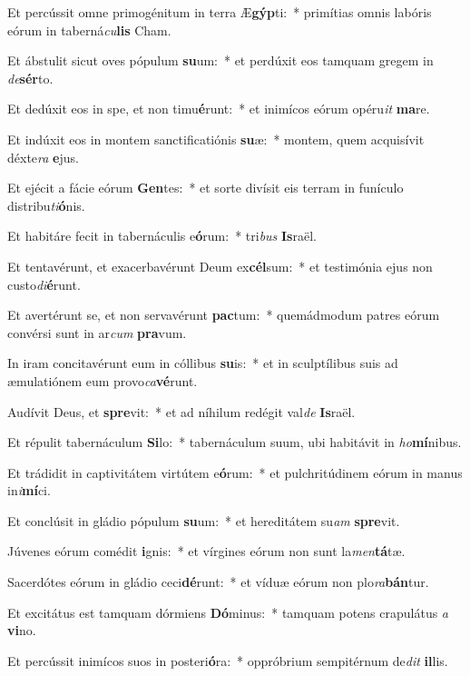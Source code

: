 \item Et percússit omne primogénitum in terra Æ\textbf{gýp}ti:~* primítias omnis labóris eórum in taberná\textit{cu}\textbf{lis} Cham.
\item Et ábstulit sicut oves pópulum \textbf{su}um:~* et perdúxit eos tamquam gregem in \textit{de}\textbf{sér}to.
\item Et dedúxit eos in spe, et non timu\textbf{é}runt:~* et inimícos eórum opéru\textit{it} \textbf{ma}re.
\item Et indúxit eos in montem sanctificatiónis \textbf{su}æ:~* montem, quem acquisívit déxte\textit{ra} \textbf{e}jus.
\item Et ejécit a fácie eórum \textbf{Gen}tes:~* et sorte divísit eis terram in funículo distribu\textit{ti}\textbf{ó}nis.
\item Et habitáre fecit in tabernáculis e\textbf{ó}rum:~* tri\textit{bus} \textbf{Is}raël.
\item Et tentavérunt, et exacerbavérunt Deum ex\textbf{cél}sum:~* et testimónia ejus non custo\textit{di}\textbf{é}runt.
\item Et avertérunt se, et non servavérunt \textbf{pac}tum:~* quemádmodum patres eórum convérsi sunt in ar\textit{cum} \textbf{pra}vum.
\item In iram concitavérunt eum in cóllibus \textbf{su}is:~* et in sculptílibus suis ad æmulatiónem eum provo\textit{ca}\textbf{vé}runt.
\item Audívit Deus, et \textbf{spre}vit:~* et ad níhilum redégit val\textit{de} \textbf{Is}raël.
\item Et répulit tabernáculum \textbf{Si}lo:~* tabernáculum suum, ubi habitávit in \textit{ho}\textbf{mí}nibus.
\item Et trádidit in captivitátem virtútem e\textbf{ó}rum:~* et pulchritúdinem eórum in manus in\textit{i}\textbf{mí}ci.
\item Et conclúsit in gládio pópulum \textbf{su}um:~* et hereditátem su\textit{am} \textbf{spre}vit.
\item Júvenes eórum comédit \textbf{i}gnis:~* et vírgines eórum non sunt la\textit{men}\textbf{tá}tæ.
\item Sacerdótes eórum in gládio ceci\textbf{dé}runt:~* et víduæ eórum non plo\textit{ra}\textbf{bán}tur.
\item Et excitátus est tamquam dórmiens \textbf{Dó}minus:~* tamquam potens crapulátus \textit{a} \textbf{vi}no.
\item Et percússit inimícos suos in posteri\textbf{ó}ra:~* oppróbrium sempitérnum de\textit{dit} \textbf{il}lis.
